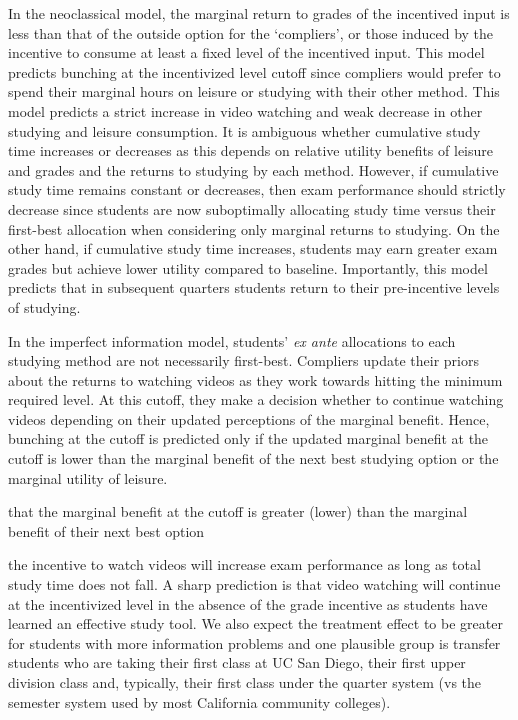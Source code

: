 \documentclass[12pt]{article}
\begin{document}
In the neoclassical model, the marginal return to grades of the incentived input is less than that of the outside option for the `compliers', or those induced by the incentive to consume at least a fixed level of the incentived input. This model predicts bunching at the incentivized level cutoff since compliers would prefer to spend their marginal hours on leisure or studying with their other method. This model predicts a strict increase in video watching and weak decrease in other studying and leisure consumption. It is ambiguous whether cumulative study time increases or decreases as this depends on relative utility benefits of leisure and grades and the returns to studying by each method. However, if cumulative study time remains constant or decreases, then exam performance should strictly decrease since students are now suboptimally allocating study time versus their first-best allocation when considering only marginal returns to studying. On the other hand, if cumulative study time increases, students may earn greater exam grades but achieve lower utility compared to baseline. Importantly, this model predicts that in subsequent quarters students return to their pre-incentive levels of studying.

In the imperfect information model, students' \textit{ex ante} allocations to each studying method are not necessarily first-best. Compliers update their priors about the returns to watching videos as they work towards hitting the minimum required level. At this cutoff, they make a decision whether to continue watching videos depending on their updated perceptions of the marginal benefit. Hence, bunching at the cutoff is predicted only if the updated marginal benefit at the cutoff is lower than the marginal benefit of the next best studying option or the marginal utility of leisure.

 that the marginal benefit at the cutoff is greater (lower) than the marginal benefit of their next best option

the incentive to watch videos will increase exam performance as long as total study time does not fall. A sharp prediction is that video watching will continue at the incentivized level in the absence of the grade incentive as students have learned an effective study tool. We also expect the treatment effect to be greater for students with more information problems and one plausible group is transfer students who are taking their first class at UC San Diego, their first upper division class and, typically, their first class under the quarter system (vs the semester system used by most California community colleges).
\end{document}
